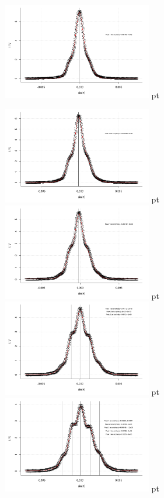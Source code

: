 \documentclass[12pt]{article}
\begin{document}
\begin{minipage}[h!]{\textwidth}
	\includegraphics[width=0.49\textwidth]{figures/ultraschall6.png} pt
\end{minipage}\newpage
\begin{minipage}[h!]{\textwidth}
	\centering
	\includegraphics[width=0.49\textwidth]{figures/ultraschall7.png} pt
	\includegraphics[width=0.49\textwidth]{figures/ultraschall8.png} pt
	\includegraphics[width=0.49\textwidth]{figures/ultraschall9.png} pt
	\includegraphics[width=0.49\textwidth]{figures/ultraschall10.png} pt

\end{minipage}
\end{document}
